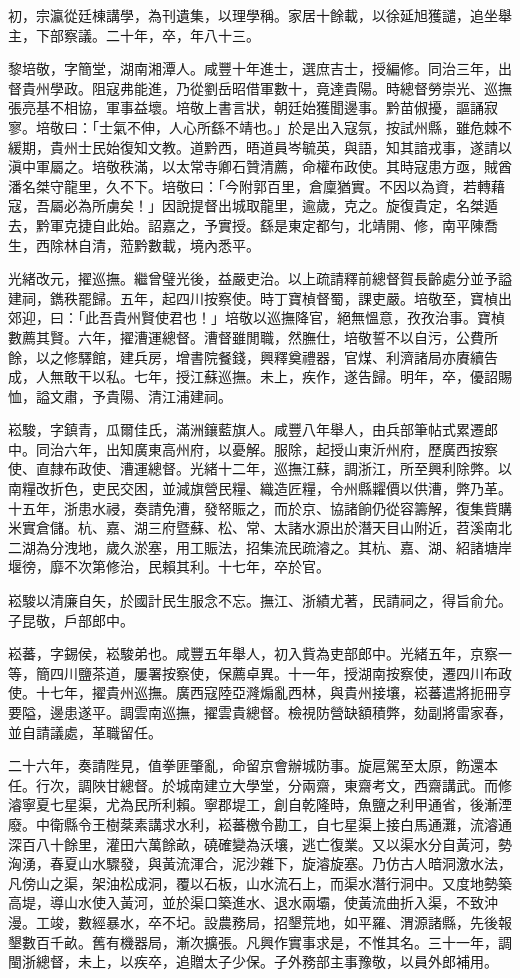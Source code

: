 \begin{pinyinscope}
初，宗瀛從廷棟講學，為刊遺集，以理學稱。家居十餘載，以徐延旭獲譴，追坐舉主，下部察議。二十年，卒，年八十三。

黎培敬，字簡堂，湖南湘潭人。咸豐十年進士，選庶吉士，授編修。同治三年，出督貴州學政。阻寇弗能進，乃從劉岳昭借軍數十，竟達貴陽。時總督勞崇光、巡撫張亮基不相協，軍事益壞。培敬上書言狀，朝廷始獲聞邊事。黔苗俶擾，謳誦寂寥。培敬曰：「士氣不伸，人心所繇不靖也。」於是出入寇氛，按試州縣，雖危棘不緩期，貴州士民始復知文教。道黔西，晤道員岑毓英，與語，知其諳戎事，遂請以滇中軍屬之。培敬秩滿，以太常寺卿石贊清薦，命權布政使。其時寇患方亟，賊酋潘名桀守龍里，久不下。培敬曰：「今附郭百里，倉廩猶實。不因以為資，若轉藉寇，吾屬必為所虜矣！」因說提督出城取龍里，逾歲，克之。旋復貴定，名桀遁去，黔軍克捷自此始。詔嘉之，予實授。繇是東定都勻，北靖開、修，南平陳喬生，西除林自清，蒞黔數載，境內悉平。

光緒改元，擢巡撫。繼曾璧光後，益嚴吏治。以上疏請釋前總督賀長齡處分並予謚建祠，鐫秩罷歸。五年，起四川按察使。時丁寶楨督蜀，課吏嚴。培敬至，寶楨出郊迎，曰：「此吾貴州賢使君也！」培敬以巡撫降官，絕無慍意，孜孜治事。寶楨數薦其賢。六年，擢漕運總督。漕督雖閒職，然膴仕，培敬誓不以自污，公費所餘，以之修驛館，建兵房，增書院餐錢，興釋奠禮器，官煤、利濟諸局亦賡續告成，人無敢干以私。七年，授江蘇巡撫。未上，疾作，遂告歸。明年，卒，優詔賜恤，謚文肅，予貴陽、清江浦建祠。

崧駿，字鎮青，瓜爾佳氏，滿洲鑲藍旗人。咸豐八年舉人，由兵部筆帖式累遷郎中。同治六年，出知廣東高州府，以憂解。服除，起授山東沂州府，歷廣西按察使、直隸布政使、漕運總督。光緒十二年，巡撫江蘇，調浙江，所至興利除弊。以南糧改折色，吏民交困，並減旗營民糧、織造匠糧，令州縣糶價以供漕，弊乃革。十五年，浙患水祲，奏請免漕，發帑賑之，而於京、協諸餉仍從容籌解，復集貲購米實倉儲。杭、嘉、湖三府暨蘇、松、常、太諸水源出於潛天目山附近，苕溪南北二湖為分洩地，歲久淤塞，用工賑法，招集流民疏濬之。其杭、嘉、湖、紹諸塘岸堰徬，靡不次第修治，民賴其利。十七年，卒於官。

崧駿以清廉自矢，於國計民生服念不忘。撫江、浙績尤著，民請祠之，得旨俞允。子昆敬，戶部郎中。

崧蕃，字錫侯，崧駿弟也。咸豐五年舉人，初入貲為吏部郎中。光緒五年，京察一等，簡四川鹽茶道，屢署按察使，保薦卓異。十一年，授湖南按察使，遷四川布政使。十七年，擢貴州巡撫。廣西寇陸亞漋煽亂西林，與貴州接壤，崧蕃遣將扼冊亨要隘，邊患遂平。調雲南巡撫，擢雲貴總督。檢視防營缺額積弊，劾副將雷家春，並自請議處，革職留任。

二十六年，奏請陛見，值拳匪肇亂，命留京會辦城防事。旋扈駕至太原，飭還本任。行次，調陜甘總督。於城南建立大學堂，分兩齋，東齋考文，西齋講武。而修濬寧夏七星渠，尤為民所利賴。寧郡堤工，創自乾隆時，魚鹽之利甲通省，後漸湮廢。中衛縣令王樹棻素講求水利，崧蕃檄令勘工，自七星渠上接白馬通灘，流濬通深百八十餘里，灌田六萬餘畝，磽確變為沃壤，逃亡復業。又以渠水分自黃河，勢洶湧，春夏山水驟發，與黃流渾合，泥沙雜下，旋濬旋塞。乃仿古人暗洞激水法，凡傍山之渠，架油松成洞，覆以石板，山水流石上，而渠水潛行洞中。又度地勢築高堤，導山水使入黃河，並於渠口築進水、退水兩壩，使黃流曲折入渠，不致沖漫。工竣，數經暴水，卒不圮。設農務局，招墾荒地，如平羅、渭源諸縣，先後報墾數百千畝。舊有機器局，漸次擴張。凡興作實事求是，不惟其名。三十一年，調閩浙總督，未上，以疾卒，追贈太子少保。子外務部主事豫敬，以員外郎補用。


\end{pinyinscope}
